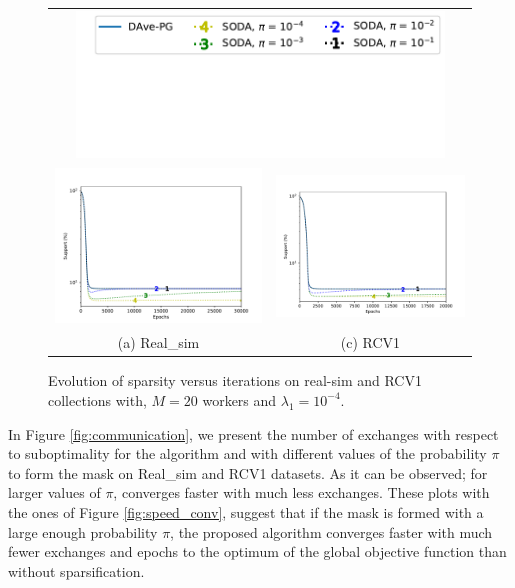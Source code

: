 \begin{figure}[b!]
\begin{tabular}{cc}
\multicolumn{2}{c}{\vspace{-4pt}\includegraphics[width = 0.9\textwidth]{SODA/Figs/legend.pdf}}\vspace*{-100pt}\\
\includegraphics[width = 0.5\linewidth]{SODA/Figs/real-sim_20w_00001_0001_density.pdf} & %
\includegraphics[width = 0.5\linewidth]{SODA/Figs/rcv_20w_00001_0001_density.pdf}\\%
(a) Real\_sim & (c) RCV1
\end{tabular}
\caption{Evolution of sparsity versus iterations on real-sim and RCV1 collections with, $M=20$ workers and $\lambda_1= 10^{-4}.$}
    \label{fig:real_diff_sp}
\end{figure}
In Figure \ref{fig:communication}, we present the number of exchanges with respect to suboptimality for the \dave{} algorithm \cite{ICML18} and \SP{} with different values of the probability $\pi$ to form the mask on Real\_sim and RCV1 datasets. As it can be observed; for larger values of $\pi$, \SP{} converges faster  with much less exchanges. These plots with the ones of Figure \ref{fig:speed_conv}, suggest that if the mask is formed with a large enough probability $\pi$, the proposed algorithm converges faster with much fewer exchanges and epochs to the optimum of the global objective function than without sparsification.


